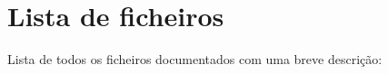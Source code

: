 \section{Lista de ficheiros}
Lista de todos os ficheiros documentados com uma breve descrição\+:\begin{DoxyCompactList}
\item{}
\end{DoxyCompactList}

